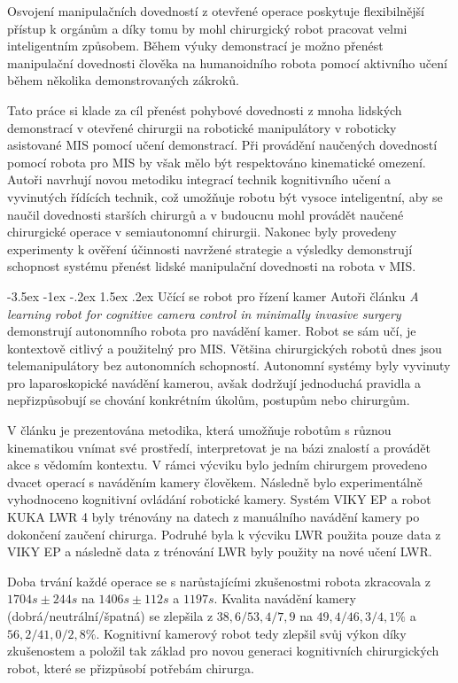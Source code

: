 \documentclass[10pt, a4paper]{article}
\makeatletter
\theoremstyle{definition}
\renewcommand\subsection{\@startsection {subsection}{1}{\z@}%
                                   {-3.5ex \@plus -1ex \@minus -.2ex}%
                                   {1.5ex \@plus.2ex}%
                                   {\normalsize\bfseries}}
\makeatother
\begin{document}
Osvojení manipulačních dovedností z otevřené operace poskytuje
flexibilnější přístup k orgánům a díky tomu by mohl chirurgický robot
pracovat velmi inteligentním způsobem.
Během výuky demonstrací
je možno přenést manipulační dovednosti člověka na humanoidního
robota pomocí aktivního učení během několika demonstrovaných zákroků.

Tato práce si klade za cíl přenést pohybové dovednosti z mnoha
lidských demonstrací v otevřené chirurgii na robotické manipulátory
v roboticky asistované MIS pomocí učení demonstrací.
Při provádění naučených dovedností pomocí robota pro MIS by však mělo
být respektováno kinematické omezení.
Autoři navrhují novou metodiku integrací technik
kognitivního učení a vyvinutých řídících technik, což umožňuje robotu
být vysoce inteligentní, aby se naučil dovednosti starších chirurgů
a v budoucnu mohl provádět naučené chirurgické operace
v semiautonomní chirurgii.
Nakonec byly provedeny experimenty k ověření účinnosti navržené strategie
a výsledky demonstrují schopnost systému přenést lidské manipulační
dovednosti na robota v MIS.

\subsection{Učící se robot pro řízení kamer}
\label{seubsec:learning}
Autoři článku \textit{A learning robot for cognitive camera control in minimally invasive surgery} \cite{self_learning}
demonstrují autonomního robota pro navádění kamer.
Robot se sám učí, je kontextově citlivý a použitelný pro MIS.
Většina chirurgických robotů dnes jsou telemanipulátory
bez autonomních schopností. Autonomní systémy byly vyvinuty
pro laparoskopické navádění kamerou, avšak dodržují jednoduchá
pravidla a nepřizpůsobují se chování konkrétním úkolům, postupům
nebo chirurgům.

V článku je prezentována metodika, která umožňuje robotům s různou
kinematikou vnímat své prostředí, interpretovat je na bázi znalostí
a provádět akce s vědomím kontextu. V rámci výcviku bylo
jedním chirurgem provedeno dvacet operací s naváděním kamery člověkem.
Následně bylo experimentálně vyhodnoceno kognitivní ovládání
robotické kamery.
Systém VIKY EP a robot KUKA LWR 4 byly trénovány na datech z
manuálního navádění kamery po dokončení zaučení chirurga.
Podruhé byla k výcviku LWR použita pouze data z VIKY EP
a následně data z trénování LWR byly použity na nové učení LWR.

Doba trvání každé operace se s narůstajícími zkušenostmi robota
zkracovala z $1704s \pm 244s$ na $1406s \pm 112s$ a $1197s$. 
Kvalita navádění kamery (dobrá/neutrální/špatná) se zlepšila 
z $38,6/53,4/7,9$ na $49,4/46,3/4,1\%$ a $56,2/41,0/2,8\%$.
Kognitivní kamerový robot tedy zlepšil svůj výkon díky zkušenostem
a položil tak základ pro novou generaci kognitivních chirurgických
robot, které se přizpůsobí potřebám chirurga.
\end{document}
